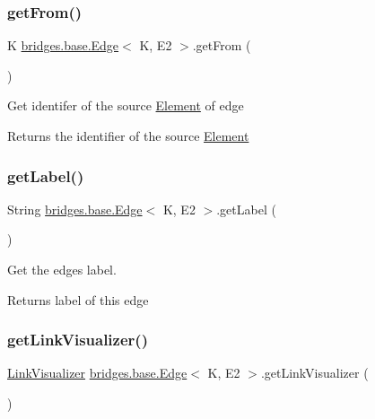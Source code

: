 \subsubsection{\texorpdfstring{get\+From()}{getFrom()}}
{\footnotesize\ttfamily K \hyperlink{classbridges_1_1base_1_1_edge}{bridges.\+base.\+Edge}$<$ K, E2 $>$.get\+From (\begin{DoxyParamCaption}{ }\end{DoxyParamCaption})}

Get identifer of the source \hyperlink{classbridges_1_1base_1_1_element}{Element} of edge

\begin{DoxyReturn}{Returns}
the identifier of the source \hyperlink{classbridges_1_1base_1_1_element}{Element} 
\end{DoxyReturn}
\mbox{\label{classbridges_1_1base_1_1_edge_a8663708d930e8df460c57d8bdbab44b2}} 
\subsubsection{\texorpdfstring{get\+Label()}{getLabel()}}
{\footnotesize\ttfamily String \hyperlink{classbridges_1_1base_1_1_edge}{bridges.\+base.\+Edge}$<$ K, E2 $>$.get\+Label (\begin{DoxyParamCaption}{ }\end{DoxyParamCaption})}



Get the edge\textquotesingle{}s label. 

\begin{DoxyReturn}{Returns}
label of this edge 
\end{DoxyReturn}
\mbox{\label{classbridges_1_1base_1_1_edge_a11c655622b8a54f2931f59b1d256f84a}} 
\subsubsection{\texorpdfstring{get\+Link\+Visualizer()}{getLinkVisualizer()}}
{\footnotesize\ttfamily \hyperlink{classbridges_1_1base_1_1_link_visualizer}{Link\+Visualizer} \hyperlink{classbridges_1_1base_1_1_edge}{bridges.\+base.\+Edge}$<$ K, E2 $>$.get\+Link\+Visualizer (\begin{DoxyParamCaption}{ }\end{DoxyParamCaption})}

